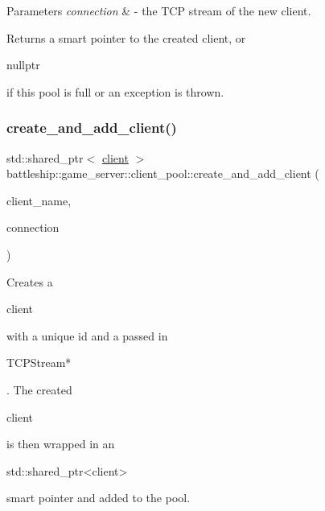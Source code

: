 \begin{DoxyParams}{Parameters}
{\em connection} & -\/ the T\+CP stream of the new client. \\
\hline
\end{DoxyParams}
\begin{DoxyReturn}{Returns}
a smart pointer to the created client, or
\begin{DoxyCode}
\textcolor{keyword}{nullptr} 
\end{DoxyCode}
 if this pool is full or an exception is thrown. 
\end{DoxyReturn}
\mbox{\label{classbattleship_1_1game__server_1_1client__pool_a12783bea5e12502d8508cfd1940523f4}} 
\subsubsection{\texorpdfstring{create\+\_\+and\+\_\+add\+\_\+client()}{create\_and\_add\_client()}}
{\footnotesize\ttfamily std\+::shared\+\_\+ptr$<$ \hyperlink{classbattleship_1_1game__server_1_1client}{client} $>$ battleship\+::game\+\_\+server\+::client\+\_\+pool\+::create\+\_\+and\+\_\+add\+\_\+client (\begin{DoxyParamCaption}\item[{const std\+::string}]{client\+\_\+name,  }\item[{\hyperlink{classtcp__stream}{tcp\+\_\+stream} $\ast$const}]{connection }\end{DoxyParamCaption})}

Creates a
\begin{DoxyCode}
client 
\end{DoxyCode}
 with a unique id and a passed in
\begin{DoxyCode}
TCPStream* 
\end{DoxyCode}
 . The created
\begin{DoxyCode}
client 
\end{DoxyCode}
 is then wrapped in an 
\begin{DoxyCode}
std::shared\_ptr<client> 
\end{DoxyCode}
 smart pointer and added to the pool.



